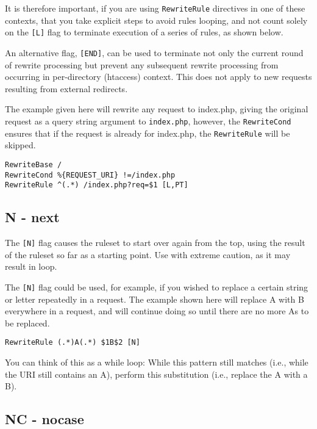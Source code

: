 It is therefore important, if you are using \verb~RewriteRule~ directives in one of these contexts, that you take explicit steps to avoid rules looping, and not count solely on the \verb~[L]~ flag to terminate execution of a series of rules, as shown below.

An alternative flag, \verb~[END]~, can be used to terminate not only the current round of rewrite processing but prevent any subsequent rewrite processing from occurring in per-directory (htaccess) context. This does not apply to new requests resulting from external redirects.

The example given here will rewrite any request to index.php, giving the original request as a query string argument to \verb~index.php~, however, the \verb~RewriteCond~ ensures that if the request is already for index.php, the \verb~RewriteRule~ will be skipped.

\begin{verbatim}
RewriteBase /
RewriteCond %{REQUEST_URI} !=/index.php
RewriteRule ^(.*) /index.php?req=$1 [L,PT]
\end{verbatim}

\subsection{N - next}
\label{nflag}

The \verb~[N]~ flag causes the ruleset to start over again from the top, using the result of the ruleset so far as a starting point. Use with extreme caution, as it may result in loop.

The \verb~[N]~ flag could be used, for example, if you wished to replace a certain string or letter repeatedly in a request. The example shown here will replace A with B everywhere in a request, and will continue doing so until there are no more As to be replaced.

\begin{verbatim}
RewriteRule (.*)A(.*) $1B$2 [N]
\end{verbatim}

You can think of this as a while loop: While this pattern still matches (i.e., while the URI still contains an A), perform this substitution (i.e., replace the A with a B).

\subsection{NC - nocase}
\label{ncflag}

